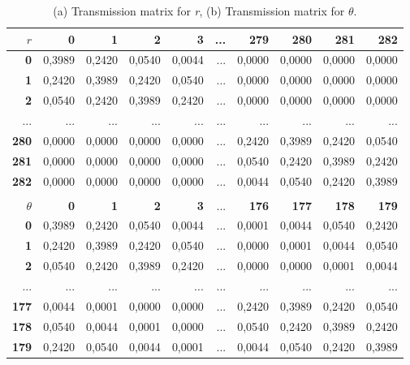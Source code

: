 \documentclass[a4paper,oneside,10pt]{article}
\begin{document}
\begin{table}
\caption{(a) Transmission matrix for \textit{r}, (b) Transmission matrix for \textit{$\theta $}.}
\centering
{\scriptsize
\begin{tabular}{|r|r|r|r|r|r|r|r|r|r|}
\hline
{\bf {\normalsize $r$}} & {\bf 0} & {\bf 1} & {\bf 2} & {\bf 3} & ... & {\bf 279} & {\bf 280} & {\bf 281} & {\bf 282} \\
\hline
{\bf 0} & 0,3989 & 0,2420 & 0,0540 & 0,0044 & ... & 0,0000 & 0,0000 & 0,0000 & 0,0000 \\
\hline
{\bf 1} & 0,2420 & 0,3989 & 0,2420 & 0,0540 & ... & 0,0000 & 0,0000 & 0,0000 & 0,0000 \\
\hline
{\bf 2} & 0,0540 & 0,2420 & 0,3989 & 0,2420 & ... & 0,0000 & 0,0000 & 0,0000 & 0,0000 \\
\hline
... & ... & ... & ... & ... & ... & ... & ... & ... & ... \\
\hline
{\bf 280} & 0,0000 & 0,0000 & 0,0000 & 0,0000 & ... & 0,2420 & 0,3989 & 0,2420 & 0,0540 \\
\hline
{\bf 281} & 0,0000 & 0,0000 & 0,0000 & 0,0000 & ... & 0,0540 & 0,2420 & 0,3989 & 0,2420 \\
\hline
{\bf 282} & 0,0000 & 0,0000 & 0,0000 & 0,0000 & ... & 0,0044 & 0,0540 & 0,2420 & 0,3989 \\
\hline
\multicolumn{10}{c}{} \\
\hline
{\bf {\normalsize $\theta$}} & {\bf 0} & {\bf 1} & {\bf 2} & {\bf 3} & ... & {\bf 176} & {\bf 177} & {\bf 178} & {\bf 179} \\
\hline
{\bf 0} & 0,3989 & 0,2420 & 0,0540 & 0,0044 & ... & 0,0001 & 0,0044 & 0,0540 & 0,2420 \\
\hline
{\bf 1} & 0,2420 & 0,3989 & 0,2420 & 0,0540 & ... & 0,0000 & 0,0001 & 0,0044 & 0,0540 \\
\hline
{\bf 2} & 0,0540 & 0,2420 & 0,3989 & 0,2420 & ... & 0,0000 & 0,0000 & 0,0001 & 0,0044 \\
\hline
... & ... & ... & ... & ... & ... & ... & ... & ... & ... \\
\hline
{\bf 177} & 0,0044 & 0,0001 & 0,0000 & 0,0000 & ... & 0,2420 & 0,3989 & 0,2420 & 0,0540 \\
\hline
{\bf 178} & 0,0540 & 0,0044 & 0,0001 & 0,0000 & ... & 0,0540 & 0,2420 & 0,3989 & 0,2420 \\
\hline
{\bf 179} & 0,2420 & 0,0540 & 0,0044 & 0,0001 & ... & 0,0044 & 0,0540 & 0,2420 & 0,3989 \\
\hline
\end{tabular}  
}
\label{aba:table3}
\end{table}
\end{document}
